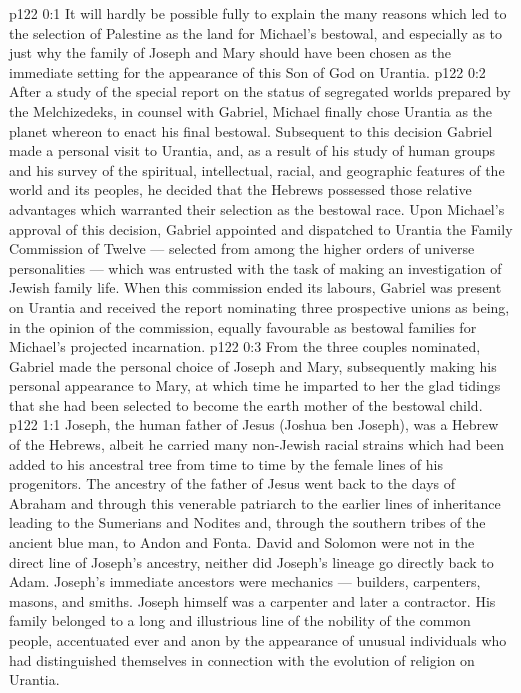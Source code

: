 \author{Midwayer Commission}
\vs p122 0:1 It will hardly be possible fully to explain the many reasons which led to the selection of Palestine as the land for Michael’s bestowal, and especially as to just why the family of Joseph and Mary should have been chosen as the immediate setting for the appearance of this Son of God on Urantia.
\vs p122 0:2 After a study of the special report on the status of segregated worlds prepared by the Melchizedeks, in counsel with Gabriel, Michael finally chose Urantia as the planet whereon to enact his final bestowal. Subsequent to this decision Gabriel made a personal visit to Urantia, and, as a result of his study of human groups and his survey of the spiritual, intellectual, racial, and geographic features of the world and its peoples, he decided that the Hebrews possessed those relative advantages which warranted their selection as the bestowal race. Upon Michael’s approval of this decision, Gabriel appointed and dispatched to Urantia the Family Commission of Twelve --- selected from among the higher orders of universe personalities --- which was entrusted with the task of making an investigation of Jewish family life. When this commission ended its labours, Gabriel was present on Urantia and received the report nominating three prospective unions as being, in the opinion of the commission, equally favourable as bestowal families for Michael’s projected incarnation.
\vs p122 0:3 From the three couples nominated, Gabriel made the personal choice of Joseph and Mary, subsequently making his personal appearance to Mary, at which time he imparted to her the glad tidings that she had been selected to become the earth mother of the bestowal child.
\vs p122 1:1 Joseph, the human father of Jesus (Joshua ben Joseph), was a Hebrew of the Hebrews, albeit he carried many non\hyp{}Jewish racial strains which had been added to his ancestral tree from time to time by the female lines of his progenitors. The ancestry of the father of Jesus went back to the days of Abraham and through this venerable patriarch to the earlier lines of inheritance leading to the Sumerians and Nodites and, through the southern tribes of the ancient blue man, to Andon and Fonta. David and Solomon were not in the direct line of Joseph’s ancestry, neither did Joseph’s lineage go directly back to Adam. Joseph’s immediate ancestors were mechanics --- builders, carpenters, masons, and smiths. Joseph himself was a carpenter and later a contractor. His family belonged to a long and illustrious line of the nobility of the common people, accentuated ever and anon by the appearance of unusual individuals who had distinguished themselves in connection with the evolution of religion on Urantia.
